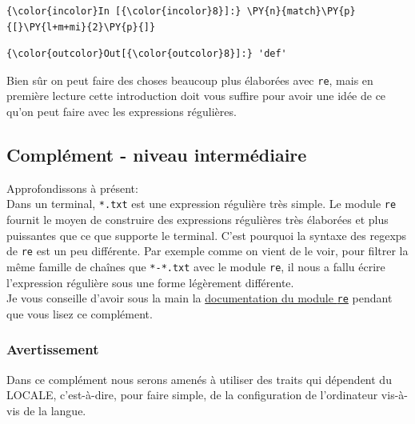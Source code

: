     \begin{Verbatim}[commandchars=\\\{\}]
{\color{incolor}In [{\color{incolor}8}]:} \PY{n}{match}\PY{p}{[}\PY{l+m+mi}{2}\PY{p}{]}
\end{Verbatim}


\begin{Verbatim}[commandchars=\\\{\}]
{\color{outcolor}Out[{\color{outcolor}8}]:} 'def'
\end{Verbatim}
            
    Bien sûr on peut faire des choses beaucoup plus élaborées avec
\texttt{re}, mais en première lecture cette introduction doit vous
suffire pour avoir une idée de ce qu'on peut faire avec les expressions
régulières.

    \hypertarget{compluxe9ment---niveau-intermuxe9diaire}{%
\subsection{Complément - niveau
intermédiaire}\label{compluxe9ment---niveau-intermuxe9diaire}}

    Approfondissons à présent:\\

    Dans un terminal, \texttt{*.txt} est une expression régulière très
simple. Le module \texttt{re} fournit le moyen de construire des
expressions régulières très élaborées et plus puissantes que ce que
supporte le terminal. C'est pourquoi la syntaxe des regexps de
\texttt{re} est un peu différente. Par exemple comme on vient de le
voir, pour filtrer la même famille de chaînes que \texttt{*-*.txt} avec
le module \texttt{re}, il nous a fallu écrire l'expression régulière
sous une forme légèrement différente.\\

    Je vous conseille d'avoir sous la main la
\href{https://docs.python.org/3/library/re.html}{documentation du module
\texttt{re}} pendant que vous lisez ce complément.

    \hypertarget{avertissement}{%
\subsubsection{Avertissement}\label{avertissement}}

    Dans ce complément nous serons amenés à utiliser des traits qui
dépendent du LOCALE, c'est-à-dire, pour faire simple, de la
configuration de l'ordinateur vis-à-vis de la langue.\\

